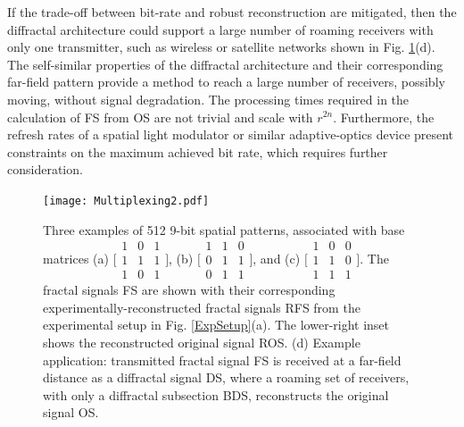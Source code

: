 If the trade-off between bit-rate and robust reconstruction are mitigated, then the diffractal architecture could support a large number of roaming receivers with only one transmitter, such as wireless or satellite networks shown in Fig. \ref{Multiplex}(d). The self-similar properties of the diffractal architecture and their corresponding far-field pattern provide a method to reach a large number of receivers, possibly moving, without signal degradation.  The processing times required in the calculation of FS from OS are not trivial and scale with $r^{2n}$. Furthermore, the refresh rates of a spatial light modulator or similar adaptive-optics device present constraints on the maximum achieved bit rate, which requires further consideration.  

\begin{figure}[t!]
\texttt{[image: Multiplexing2.pdf]}
\caption[]{Three examples of 512 9-bit spatial patterns, associated with base matrices 
(a) $\Big[\begin{smallmatrix} 1 & 0 & 1\\ 1 & 1 & 1\\ 1 & 0 & 1 \end{smallmatrix}\Big]$, (b) $\Big[\begin{smallmatrix} 1 & 1 & 0 \\ 0 & 1 & 1\\ 0 & 1 & 1\end{smallmatrix}\Big]$, and (c) $\Big[\begin{smallmatrix} 1 & 0 & 0 \\ 1 & 1 & 0\\ 1 & 1 & 1\end{smallmatrix}\Big]$. The fractal signals FS are shown with their corresponding experimentally-reconstructed fractal signals RFS from the experimental setup in Fig. \ref{ExpSetup}(a).  The lower-right inset shows the reconstructed original signal ROS. (d) Example application: transmitted fractal signal FS is received at a far-field distance as a diffractal signal DS, where a roaming set of receivers, with only a diffractal subsection BDS, reconstructs the original signal OS.}
\label{Multiplex}
\end{figure}

